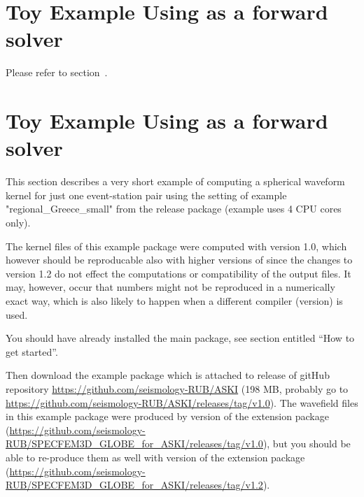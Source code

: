 \section{Toy Example Using  as a forward solver} \label{guide,sec:example_SPEC_C}
%
%
Please refer to section~.
%
%
\newpage
\section{Toy Example Using  as a forward solver} \label{guide,sec:example_SPEC_GLOB}
%
%
This section describes a very short example of computing a spherical waveform kernel for just one event-station 
pair using the setting of example "regional\_Greece\_small" from the  release package 
(example uses 4 CPU cores only).

The kernel files of this example package were computed with \ASKI{} version 1.0, which however should
be reproducable also with higher versions of \ASKI{}
since the changes to version 1.2 do not effect the 
computations or compatibility of the output files. It may, however, 
occur that numbers might not be reproduced in a numerically exact way, which is also likely to happen
when a different compiler (version) is used. 

You should have already installed the \ASKI{} main package, see section entitled ``How to get started''. 

Then download the example
package  which is attached to release  
of gitHub repository \url{https://github.com/seismology-RUB/ASKI} (198 MB, probably go to 
\url{https://github.com/seismology-RUB/ASKI/releases/tag/v1.0}).
The wavefield files in this example package were produced by version  of the extension package
(\url{https://github.com/seismology-RUB/SPECFEM3D_GLOBE_for_ASKI/releases/tag/v1.0}), 
but you should be able to re-produce them as well with version  of the extension package
(\url{https://github.com/seismology-RUB/SPECFEM3D_GLOBE_for_ASKI/releases/tag/v1.2}).

